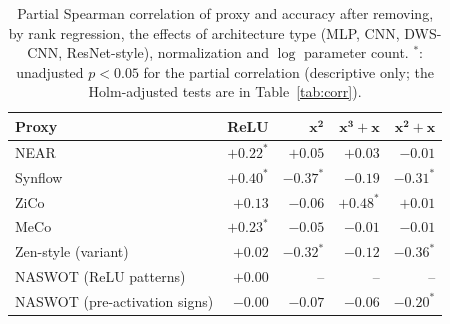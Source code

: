 \begin{table}[h]
\centering
\caption{Partial Spearman correlation of proxy and accuracy after removing, by rank regression, the effects of
  architecture type (MLP, CNN, DWS-CNN, ResNet-style), normalization and $\log$ parameter count.  ${}^{*}$: unadjusted
  $p<0.05$ for the partial correlation (descriptive only; the Holm-adjusted tests are in Table~\ref{tab:corr}).}
\label{tab:partial}
\small
\begin{tabular}{lrrrr}
\toprule
\textbf{Proxy} & \textbf{ReLU} & $\bm{x^2}$ & $\bm{x^3{+}x}$ & $\bm{x^2{+}x}$ \\
\midrule
NEAR & $+0.22^{*}$ & $+0.05$ & $+0.03$ & $-0.01$ \\
Synflow & $+0.40^{*}$ & $-0.37^{*}$ & $-0.19$ & $-0.31^{*}$ \\
ZiCo & $+0.13$ & $-0.06$ & $+0.48^{*}$ & $+0.01$ \\
MeCo & $+0.23^{*}$ & $-0.05$ & $-0.01$ & $-0.01$ \\
Zen-style (variant) & $+0.02$ & $-0.32^{*}$ & $-0.12$ & $-0.36^{*}$ \\
NASWOT (ReLU patterns) & $+0.00$ & -- & -- & -- \\
NASWOT (pre-activation signs) & $-0.00$ & $-0.07$ & $-0.06$ & $-0.20^{*}$ \\
\bottomrule
\end{tabular}
\end{table}
